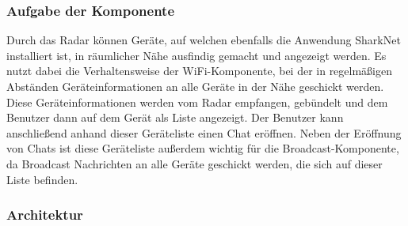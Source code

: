 \subsubsection{Aufgabe der Komponente}
Durch das Radar können Geräte, auf welchen ebenfalls die Anwendung SharkNet installiert ist, in räumlicher Nähe ausfindig gemacht und angezeigt werden. Es nutzt dabei die Verhaltensweise der WiFi-Komponente, bei der in regelmäßigen Abständen Ge\-rä\-te\-in\-for\-ma\-tio\-nen an alle Geräte in der Nähe geschickt werden. Diese Geräteinformationen werden vom Radar empfangen, gebündelt und dem Benutzer dann auf dem Gerät als Liste angezeigt. Der Benutzer kann anschließend anhand dieser Geräteliste einen Chat eröffnen. Neben der Eröffnung von Chats ist diese Geräteliste außerdem wichtig für die Broadcast-Komponente, da Broadcast Nachrichten an alle Geräte geschickt werden, die sich auf dieser Liste befinden.

\subsubsection{Architektur}

